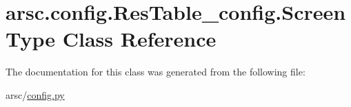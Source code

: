 \hypertarget{classarsc_1_1config_1_1ResTable__config_1_1ScreenType}{}\section{arsc.\+config.\+Res\+Table\+\_\+config.\+Screen\+Type Class Reference}
\label{classarsc_1_1config_1_1ResTable__config_1_1ScreenType}


The documentation for this class was generated from the following file\+:\begin{DoxyCompactItemize}
\item 
arsc/\mbox{\hyperlink{config_8py}{config.\+py}}\end{DoxyCompactItemize}
